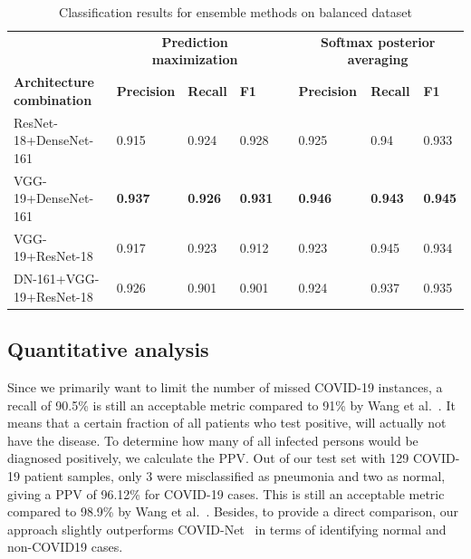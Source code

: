 \documentclass[conference]{IEEEtran}
\begin{document}
\begin{table}
    \centering
    \caption{Classification results for ensemble methods on balanced dataset}
	\label{Table:ensemble_result}
	\scriptsize{
	\begin{tabular}{p{4.3cm}p{1.6cm}p{1.1cm}p{0.8cm}p{0.1cm}p{1.6cm}p{1.1cm}p{0.8cm}}
		 &  \multicolumn{3}{c}{\textbf{Prediction maximization}} && \multicolumn{3}{c}{\textbf{Softmax posterior averaging}}  \\	
		\cmidrule{2-4}\cmidrule{6-8}
		\textbf{Architecture combination} &  \textbf{Precision} & \textbf{Recall}& \textbf{F1}&& \textbf{Precision} & \textbf{Recall}& \textbf{F1}\\
		\hline
		ResNet-18+DenseNet-161 & 0.915 & 0.924 & 0.928 && 0.925 & 0.94 & 0.933\\
		VGG-19+DenseNet-161 & \textbf{0.937} & \textbf{0.926} & \textbf{0.931} && \textbf{0.946} & \textbf{0.943} & \textbf{0.945}\\
		VGG-19+ResNet-18 & 0.917 & 0.923 & 0.912 &&  0.923 & 0.945 & 0.934\\
		DN-161+VGG-19+ResNet-18 & 0.926 & 0.901 & 0.901 && 0.924 & 0.937 & 0.935\\
		\hline 
	\end{tabular}}
\end{table}

\subsection{Quantitative analysis}
Since we primarily want to limit the number of missed COVID-19 instances, a recall of 90.5\% is still an acceptable metric compared to 91\% by Wang et al.~\cite{wang2020covid}. It means that a certain fraction of all patients who test positive, will actually not have the disease. To determine how many of all infected persons would be diagnosed positively, we calculate the PPV. Out of our test set with 129 COVID-19 patient samples, only 3 were misclassified as pneumonia and two as normal, giving a PPV of 96.12\% for COVID-19 cases. This is still an acceptable metric compared to 98.9\% by Wang et al.~\cite{wang2020covid}. Besides, to provide a direct comparison, our approach slightly outperforms COVID-Net~\cite{wang2020covid} in terms of identifying normal and non-COVID19 cases. 
\end{document}
